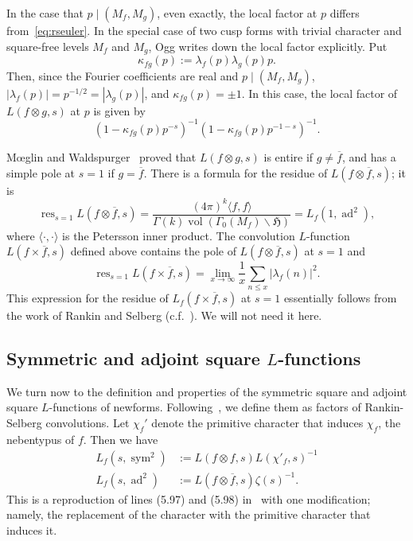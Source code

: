 \documentclass[11pt,reqno]{amsart} \usepackage{fullpage}
\renewcommand{\leq}{\leqslant}
\newcommand{\ra}{\rightarrow}
\newcommand\be{\begin{equation}}
\newcommand\ee{\end{equation}}
\newcommand{\Lsym}[2][]{L_f#1\left(#2,\sym^2\right)}
\newcommand{\Lad}[1]{L_f\left(#1,\ad^2\right)}
\DeclareMathOperator{\res}{res}
\DeclareMathOperator{\sym}{sym}
\DeclareMathOperator{\ad}{ad}
\numberwithin{equation}{section}
\begin{document}
In the case that $p\mid(M_f,M_g)$, even exactly, the local factor at $p$ differs
from~\eqref{eq:rseuler}. In the special case of two cusp forms with trivial
character and square-free levels $M_f$ and $M_g$, Ogg writes down the local
factor explicitly. Put \be \kappa_{fg}(p):=\lambda_f(p)\lambda_g(p)p.\ee
Then, since the Fourier coefficients are real and $p\mid(M_f,M_g)$,
$\left|\lambda_f(p)\right|=p^{-1/2}=\left|\lambda_g(p)\right|$, and
$\kappa_{fg}(p)=\pm1$. In this case, the local factor of $L(f\otimes g,s)$ at
$p$ is given by \be\label{eq:ogglocal2} \left(1-\kappa_{fg}(p)p^{-s}\right)^{-1}
\left(1-\kappa_{fg}(p)p^{-1-s}\right)^{-1}.\ee

Mœglin and Waldspurger~\cite{MW} proved that $L(f\otimes g,s)$ is entire if
$g\ne\overline f$, and has a simple pole at $s=1$ if $g=\overline f$.
There is a formula for the residue of $L(f\otimes\overline f,s)$; it is
\be\label{eq:rsres}
\res_{s=1}L(f\otimes\overline f,s)=\frac{(4\pi)^k\langle f,f\rangle}
{\Gamma(k)\operatorname{vol}(\Gamma_0(M_f)\backslash\mathfrak H)}=\Lad{1},\ee
where $\langle \cdot,\cdot\rangle$ is the Petersson inner product.
The convolution $L$-function $L(f\times\overline f,s)$ defined above contains
the pole of $L(f\otimes\overline f,s)$ at $s=1$ and
\be\res_{s=1} L(f\times\overline f,s)
= \lim_{x\ra\infty}\frac1 x\sum_{n\leq x}\left|\lambda_f(n)\right|^2.\ee
This expression for the residue of $L_f(f\times\overline f,s)$ at $s=1$
essentially follows from the work of Rankin and Selberg
(c.f.~\cite[Remark~1.3, p.4]{simplezeros}). We will not need it here.

\subsection{Symmetric and adjoint square $L$-functions}\label{sec:symad}
We turn now to the definition and properties of the symmetric square and
adjoint square $L$-functions of newforms. Following~\cite{IK}, we define them as
factors of Rankin-Selberg convolutions. Let $\chi_f'$ denote the primitive
character that induces $\chi_f$, the nebentypus of $f$. Then we have
\begin{align}
  \label{eq:symfactorization}
  \Lsym{s} &:= L(f\otimes f,s)L(\chi'_f,s)^{-1} \\
  \label{eq:adfactorization}
  \Lad{s} &:= L(f\otimes\overline f,s)\zeta(s)^{-1}.
\end{align}
This is a reproduction of lines (5.97) and (5.98) in~\cite{IK} with one modification;
namely, the replacement of the character with the primitive character that
induces it.
\end{document}

